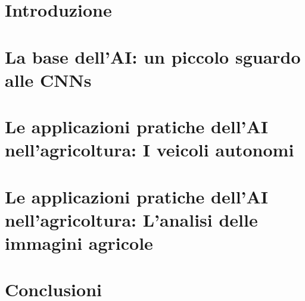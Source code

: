 \documentclass{article}
\begin{document}
	
	
	
	\tableofcontents
	
	\newpage
	
	\section{Introduzione}
	\label{se:intro}
	

	\newpage

	\section{La base dell'AI: un piccolo sguardo alle CNNs}
	\label{se:cnn}
	

	\newpage

	\section{Le applicazioni pratiche dell'AI nell'agricoltura: I veicoli autonomi}
	\label{se:app_pra}
	
	
	\newpage

	\section{Le applicazioni pratiche dell'AI nell'agricoltura: L'analisi delle immagini agricole}
	\label{se:app_pra_2}
	

	\newpage

	\section{Conclusioni}
	\label{se:conc}
	

	\newpage

	\nocite{*}
	\printbibliography %
\end{document}
